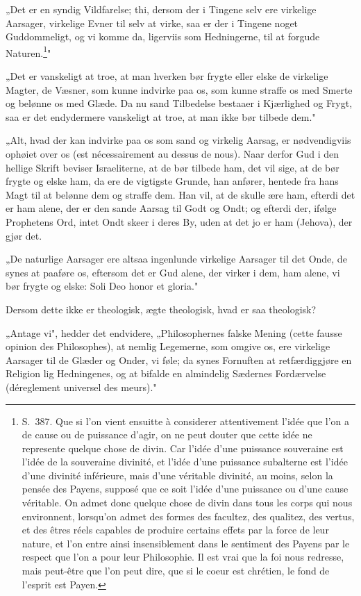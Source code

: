 \documentclass[12pt,a4paper]{article}
\newcommand{\opage}[1]{\marginnote{\footnotesize\textit{[#1]}}}
\begin{document}
„Det er en syndig Vildfarelse; thi, dersom der i Tingene selv ere virkelige
Aarsager, virkelige Evner til selv at virke, saa er der i Tingene noget
Guddommeligt, og vi komme da, ligerviis som Hedningerne, til at forgude
Naturen.\footnote{S.~387. Que si l'on vient ensuitte à considerer attentivement
l'idée que l'on a de cause ou de puissance d'agir, on ne peut douter que cette
idée ne represente quelque chose de divin. Car l'idée d'une puissance souveraine
est l'idée de la souveraine divinité, et l'idée d'une puissance subalterne est
l'idée d'une divinité inférieure, mais d'une véritable divinité, au moins, selon
la pensée des Payens, supposé que ce soit l'idée d'une puissance ou d'une cause
véritable. On admet donc quelque chose de divin dans tous les corps qui nous
environnent, lorsqu'on admet des formes des facultez, des qualitez, des vertus,
et des êtres réels capables de produire certains effets par la force de leur
nature, et l'on entre ainsi insensiblement dans le sentiment des Payens par le
respect que l'on a pour leur Philosophie. Il est vrai que la foi nous redresse,
mais peut-être que l'on peut dire, que si le coeur est chrétien, le fond de
l'esprit est Payen.}"

„Det er vanskeligt at troe, at man hverken bør frygte eller elske de virkelige
Magter, de Væsner, som kunne indvirke paa os, som kunne straffe os med Smerte og
belønne os med Glæde. Da nu sand Tilbedelse bestaaer i Kjærlighed og Frygt, saa
er det endydermere vanskeligt at troe, at man ikke bør tilbede dem."

„Alt, hvad der kan indvirke paa os som sand og virkelig Aarsag, er nødvendigviis
ophøiet over os (est nécessairement au dessus de nous). Naar derfor Gud i den
hellige Skrift beviser Israeliterne, at de bør tilbede ham, det vil sige, at de
bør frygte og elske ham, da ere de vigtigste Grunde, han anfører, hentede fra
hans Magt til at belønne dem og straffe dem.
\opage{20} Han vil, at de skulle ære ham, efterdi det er ham alene, der er den sande Aarsag
til Godt og Ondt; og efterdi der, ifølge Prophetens Ord, intet Ondt skeer i
deres By, uden at det jo er ham (Jehova), der gjør det.

„De naturlige Aarsager ere altsaa ingenlunde virkelige Aarsager til det Onde, de
synes at paaføre os, eftersom det er Gud alene, der virker i dem, ham alene, vi
bør frygte og elske: Soli Deo honor et gloria."

Dersom dette ikke er theologisk, ægte theologisk, hvad er saa theologisk?

„Antage vi", hedder det endvidere, „Philosophernes falske Mening (cette fausse
opinion des Philosophes), at nemlig Legemerne, som omgive os, ere virkelige
Aarsager til de Glæder og Onder, vi føle; da synes Fornuften at retfærdiggjøre en
Religion lig Hedningenes, og at bifalde en almindelig Sædernes Fordærvelse
(déreglement universel des meurs)."
\end{document}
